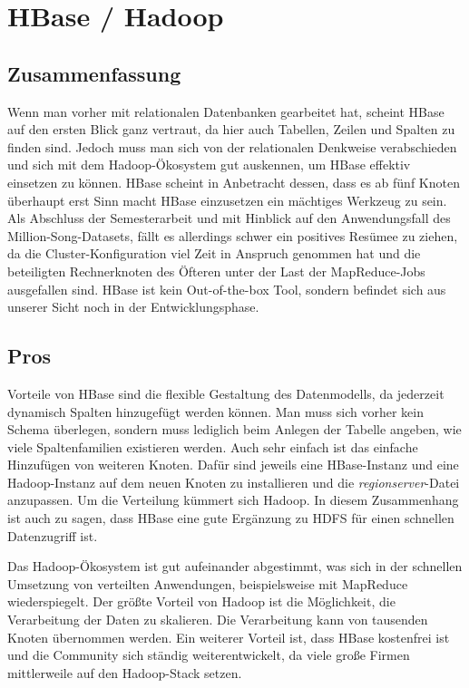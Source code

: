 \section{HBase / Hadoop}
\subsection{Zusammenfassung}
Wenn man vorher mit relationalen Datenbanken gearbeitet hat, scheint HBase auf den ersten Blick ganz vertraut, da hier auch Tabellen, Zeilen und Spalten zu finden sind. Jedoch muss man sich von der relationalen Denkweise verabschieden und sich mit dem Hadoop-Ökosystem gut auskennen, um HBase effektiv einsetzen zu können. HBase scheint in Anbetracht dessen, dass es ab fünf Knoten überhaupt erst Sinn macht HBase einzusetzen ein mächtiges Werkzeug zu sein. Als Abschluss der Semesterarbeit und mit Hinblick auf den Anwendungsfall des Million-Song-Datasets, fällt es allerdings schwer ein positives Resümee zu ziehen, da die Cluster-Konfiguration viel Zeit in Anspruch genommen hat und die beteiligten Rechnerknoten des Öfteren unter der Last der MapReduce-Jobs ausgefallen sind. HBase ist kein Out-of-the-box Tool, sondern befindet sich aus unserer Sicht noch in der Entwicklungsphase.

\subsection{Pros}
Vorteile von HBase sind die flexible Gestaltung des Datenmodells, da jederzeit dynamisch Spalten hinzugefügt werden können. Man muss sich vorher kein Schema überlegen, sondern muss lediglich beim Anlegen der Tabelle angeben, wie viele Spaltenfamilien existieren werden. Auch sehr einfach ist das einfache Hinzufügen von weiteren Knoten. Dafür sind jeweils eine HBase-Instanz und eine Hadoop-Instanz auf dem neuen Knoten zu installieren und die \textit{regionserver}-Datei anzupassen. Um die Verteilung kümmert sich Hadoop. In diesem Zusammenhang ist auch zu sagen, dass HBase eine gute Ergänzung zu \ac{HDFS} für einen schnellen Datenzugriff ist.

Das Hadoop-Ökosystem ist gut aufeinander abgestimmt, was sich in der schnellen Umsetzung von verteilten Anwendungen, beispielsweise mit MapReduce wiederspiegelt.
Der größte Vorteil von Hadoop ist die Möglichkeit, die Verarbeitung der Daten zu skalieren. Die Verarbeitung kann von tausenden Knoten übernommen werden. Ein weiterer Vorteil ist, dass HBase kostenfrei ist und die Community sich ständig weiterentwickelt, da viele große Firmen mittlerweile auf den Hadoop-Stack setzen. 


